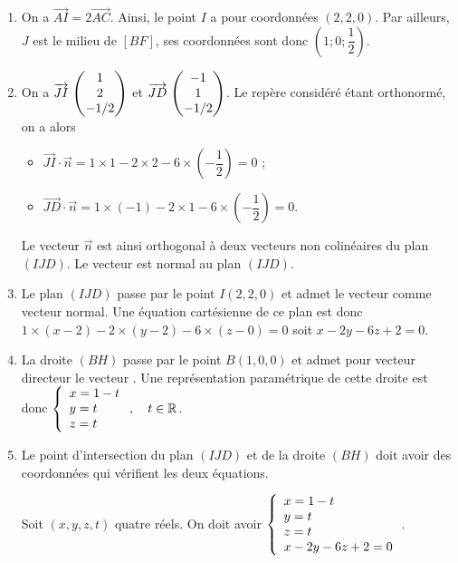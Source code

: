 \documentclass[11pt,fleqn, openany]{book} %
\begin{document}
\begin{solution}\hspace{0pt}
\begin{enumerate}
    \item On a $\overrightarrow{AI}=2\overrightarrow{AC}$. Ainsi, le point $I$ a pour coordonnées $(2,2,0)$. Par ailleurs, $J$ est le milieu de $[BF]$, ses coordonnées sont donc $\left(1;0;\dfrac{1}{2}\right)$.  
    
    \item On a $\coorde{JI}{1}{2}{-1/2}$ et $\coorde{JD}{-1}{1}{-1/2}$. Le repère considéré étant orthonormé, on a alors
    
    \begin{itemize}
    \item $\overrightarrow{JI}\cdot \vec n = 1 \times 1 -2 \times 2 - 6 \times \left(-\dfrac{1}{2}\right)=0$ ;
    \item $\overrightarrow{JD} \cdot \vec n = 1 \times (-1) -2 \times 1 -6 \times \left(-\dfrac{1}{2}\right)=0$.
    \end{itemize}
    Le vecteur $\vec n$ est ainsi orthogonal à deux vecteurs non colinéaires du plan $(IJD)$. Le vecteur  est normal au plan $(IJD)$.
    
    \item  Le plan $(IJD)$ passe par le point $I(2,2,0)$ et admet le vecteur  comme vecteur normal. Une équation cartésienne de ce plan est donc
    $ 1 \times (x-2) -2 \times (y-2) -6 \times (z-0)=0$
    soit $x-2y-6z+2=0$.
    
    \item La droite $(BH)$ passe par le point $B(1,0,0)$ et admet pour vecteur directeur le vecteur . Une représentation paramétrique de cette droite est donc
    $\left\{\renewcommand{\arraystretch}{1}\renewcommand{\arraystretch}{1}\begin{array}{l}x=1-t\\y=t\\z=t
    
    \end{array}\right.,\quad t \in\mathbb{R}$.
    \item Le point d'intersection du plan $(IJD)$ et de la droite $(BH)$ doit avoir des coordonnées qui vérifient les deux équations. 
    
    Soit $(x,y,z,t)$ quatre réels. On doit avoir $\left\{\renewcommand{\arraystretch}{1}\renewcommand{\arraystretch}{1}\begin{array}{l}x=1-t\\y=t\\z=t\\x-2y-6z+2=0
    \end{array}\right.$.
    

\end{enumerate}
\end{solution}
\end{document}
